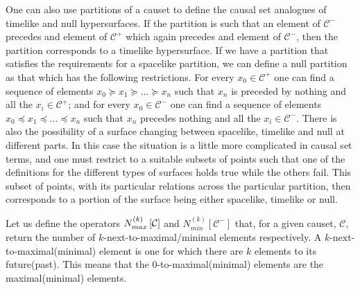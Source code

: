 \documentclass[12pt]{article}
\newcommand{\mb}[1]{\marginnote{\color{red}{\small MB:\,#1}}}
\begin{document}
One can also use partitions of a causet to define the causal set analogues of timelike and null hypersurfaces. If the partition is such that an element of $\mathcal{C}^-$ precedes and element of $\mathcal{C}^+$ which again precedes and element of $\mathcal{C}^-$, then the partition corresponds to a timelike hypersurface. If we have a partition that satisfies the requirements for a spacelike partition, we can define a null partition as that which has the following restrictions. For every $x_0\in\mathcal{C}^+$ one can find a sequence of elements $x_0 \succeq x_1 \succeq ...\succeq x_n$ such that $x_n$ is preceded by nothing and all the $x_i \in \mathcal{C}^+$; and for every $x_0\in\mathcal{C}^-$ one can find a sequence of elements $x_0 \preceq x_1 \preceq ...\preceq x_n$ such that $x_n$ precedes nothing and all the $x_i \in \mathcal{C}^-$. There is also the possibility of a surface changing between spacelike, timelike and null at different parts. In this case the situation is a little more complicated in causal set terms, and one must restrict to a suitable subsets of points such that one of the definitions for the different types of surfaces holds true while the others fail. This subset of points, with its particular relations across the particular partition, then corresponds to a portion of the surface being either spacelike, timelike or null.


Let us define the operators $N_{\vphantom{i}max}^{(k)}\left[\mathcal{C} \right]$ and $N_{min}^{(k)}\left[\mathcal{C}^- \right]$ that, for a given causet, $\mathcal{C}$, return the number of $k$-next-to-maximal/minimal elements respectively. A $k$-next-to-maximal(minimal) element is one for which there are $k$ elements to its future(past). This means that the $0$-to-maximal(minimal) elements are the maximal(minimal) elements.
\end{document}
